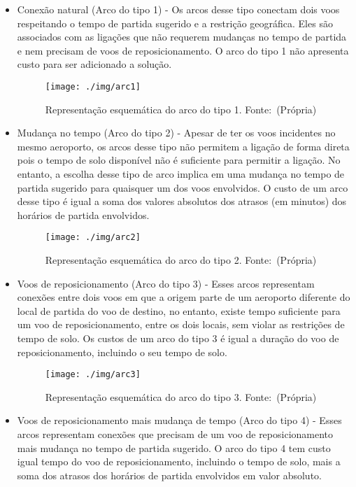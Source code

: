   
  \begin{itemize}
\item Conexão natural (Arco do tipo 1) - Os arcos desse tipo conectam dois voos respeitando o tempo de partida sugerido e
a restrição geográfica. Eles são associados com as ligações que não requerem mudanças no tempo de partida e nem
       precisam de voos de reposicionamento. O arco do tipo 1 não apresenta custo para ser adicionado a solução.

\begin{figure}[ht]
	\caption{Representação esquemática do arco do tipo 1. \mbox{Fonte: (Própria)}}
	\label{fig:arc1}
	\texttt{[image: ./img/arc1]}
	
\end{figure}

\item Mudança no tempo (Arco do tipo 2) - Apesar de ter os voos incidentes no mesmo aeroporto, os arcos desse tipo não
permitem a ligação de forma direta pois o tempo de solo disponível não é suficiente para permitir a ligação. No
      entanto, a escolha desse tipo de arco implica em uma mudança no tempo de partida sugerido para quaisquer um dos
      voos envolvidos. O custo de um arco desse tipo é igual a soma dos valores absolutos dos atrasos (em minutos) dos
      horários de partida envolvidos.
      
\begin{figure}[ht]
	\caption{Representação esquemática do arco do tipo 2. \mbox{Fonte: (Própria)}}
	\label{fig:arc2}
	\texttt{[image: ./img/arc2]}
	
\end{figure}

\item Voos de reposicionamento (Arco do tipo 3) - Esses arcos representam conexões entre dois voos em que a origem
parte de um aeroporto diferente do local de partida do voo de destino, no entanto, existe tempo suficiente para um voo
de reposicionamento, entre os dois locais, sem violar as restrições de tempo de solo. Os custos de um arco do tipo 3 é
  igual a duração do voo de reposicionamento, incluindo o seu tempo de solo.

\begin{figure}[ht]
	\caption{Representação esquemática do arco do tipo 3. \mbox{Fonte: (Própria)}}
	\label{fig:arc3}
	\texttt{[image: ./img/arc3]}
	
\end{figure}

\item Voos de reposicionamento mais mudança de tempo (Arco do tipo 4) - Esses arcos representam conexões que
precisam de um voo de reposicionamento mais mudança no tempo de partida sugerido. O arco do tipo 4 tem custo
igual tempo do voo de reposicionamento, incluindo o tempo de solo, mais a soma dos atrasos dos horários de partida
envolvidos em valor absoluto.


\end{itemize}
